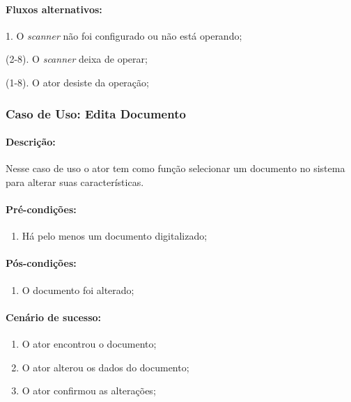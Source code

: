 \paragraph{Fluxos alternativos:}
\begin{description}
    \item 1. O {\it scanner} não foi configurado ou não está operando; 
    \item (2-8). O {\it scanner} deixa de operar; 
    \item (1-8). O ator desiste da operação; 
\end{description}

\newpage
\subsubsection{Caso de Uso: Edita Documento}

\paragraph{Descrição:} Nesse caso de uso o ator tem como função selecionar um documento no sistema para alterar suas características.

\paragraph{Pré-condições:}
\begin{enumerate}
    \item Há pelo menos um documento digitalizado;
\end{enumerate}

\paragraph{Pós-condições:} 
\begin{enumerate}
    \item O documento foi alterado;
\end{enumerate}
    
\paragraph{Cenário de sucesso:}
\begin{enumerate}
    \item O ator encontrou o documento;
    \item O ator alterou os dados do documento;
    \item O ator confirmou as alterações;
\end{enumerate}

